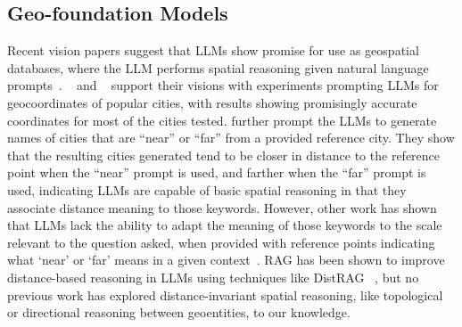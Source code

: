 \subsection{Geo-foundation Models}
Recent vision papers suggest that LLMs show promise for use as geospatial databases, where the LLM performs spatial reasoning given natural language prompts~\cite{Bhandari2023, Qi2023}.
\citeauthor{Bhandari2023}~\cite{Bhandari2023} and \citeauthor{Qi2023}~\cite{Qi2023} support their visions with experiments prompting LLMs for geocoordinates of popular cities, with results showing promisingly accurate coordinates for most of the cities tested.
\citeauthor{Bhandari2023} further prompt the LLMs to generate names of cities that are ``near'' or ``far'' from a provided reference city.
They show that the resulting cities generated tend to be closer in distance to the reference point when the ``near'' prompt is used, and farther when the ``far'' prompt is used, indicating LLMs are capable of basic spatial reasoning in that they associate distance meaning to those keywords.
However, other work has shown that LLMs lack the ability to adapt the meaning of those keywords to the scale relevant to the question asked, when provided with reference points indicating what `near' or `far' means in a given context~\cite{Osullivan2024}.
RAG has been shown to improve distance-based reasoning in LLMs using techniques like DistRAG~\cite{} , but no previous work has explored distance-invariant spatial reasoning, like topological or directional reasoning between geoentities, to our knowledge.

